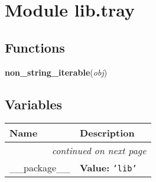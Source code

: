 %
%
%


\section{Module lib.tray}

    \label{lib:tray}


  \subsection{Functions}

    \label{lib:tray:non_string_iterable}

    \vspace{0.5ex}

\hspace{.8\funcindent}\begin{boxedminipage}{\funcwidth}

    \raggedright \textbf{non\_string\_iterable}(\textit{obj})

\setlength{\parskip}{2ex}
\setlength{\parskip}{1ex}
    \end{boxedminipage}



  \subsection{Variables}

    \vspace{-1cm}
\hspace{\varindent}\begin{longtable}{|p{\varnamewidth}|p{\vardescrwidth}|l}
\cline{1-2}
\cline{1-2} \centering \textbf{Name} & \centering \textbf{Description}& \\
\cline{1-2}
\endhead\cline{1-2}\multicolumn{3}{r}{\small\textit{continued on next page}}\\\endfoot\cline{1-2}
\endlastfoot\raggedright \_\-\_\-p\-a\-c\-k\-a\-g\-e\-\_\-\_\- & \raggedright \textbf{Value:} 
{\tt \texttt{'}\texttt{lib}\texttt{'}}&\\
\cline{1-2}
\end{longtable}



